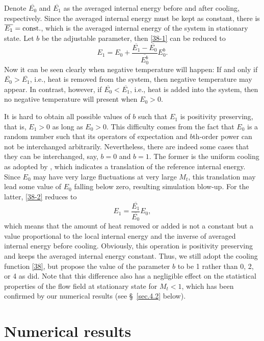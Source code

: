 \documentclass[review]{elsarticle}
\newcommand{\fr}{\frac}
\newcommand{\er}{\eqref}
\begin{document}
Denote $\overline{E_0}$ and $\overline{E_1}$ as the averaged internal energy before and after cooling, respectively. Since the averaged internal energy must be kept as constant, there is $\overline{E_1} = \rm const.$, which is the averaged internal energy of the system in stationary state. Let $b$ be the adjustable parameter, then \er{38-1} can be reduced to
\begin{equation}\label{38-2}
  E_1 = E_0 + \fr{\overline{E_1} - \overline{E_0}}{\overline{E_0^b}} E_0^b.
\end{equation}
Now it can be seen clearly when negative temperature will happen: If and only if $\overline{E_0} > \overline{E_1}$, i.e., heat is removed from the system, then negative temperature may appear. In contrast, however, if $\overline{E_0} < \overline{E_1}$, i.e., heat is added into the system, then no negative temperature will present when $E_0 > 0$.

It is hard to obtain all possible values of $b$ such that $E_1$ is positivity preserving, that is, $E_1 > 0$ as long as $E_0>0$. This difficulty comes from the fact that $E_0$ is a random number such that its operators of expectation and $b$th-order power can not be interchanged arbitrarily. Nevertheless, there are indeed some cases that they can be interchanged, say, $b = 0$ and $b=1$. The former is the uniform cooling as adopted by \citet{Wang2010}, which indicates a translation of the reference internal energy. Since $E_0$ may have very large fluctuations at very large $M_t$, this translation may lead some value of $E_0$ falling below zero, resulting simulation blow-up. For the latter, \er{38-2} reduces to
\begin{equation}\label{38-3}
  E_1 = \fr{\overline{E_1}}{\overline{E_0}} E_0,
\end{equation}
which means that the amount of heat removed or added is not a constant but a value proportional to the local internal energy and the inverse of averaged internal energy before cooling. Obviously, this operation is positivity preserving and keeps the averaged internal energy constant. Thus, we still adopt the cooling function \er{38}, but propose the value of the parameter $b$ to be 1 rather than 0, 2, or 4 as \citet{Wang2010} did. Note that this difference also has a negligible effect on the statistical properties of the flow field at stationary state for $M_t < 1$, which has been confirmed by our numerical results (see \S~\ref{sec.4.2} below).



\section{Numerical results}\label{sec.4}
\end{document}
